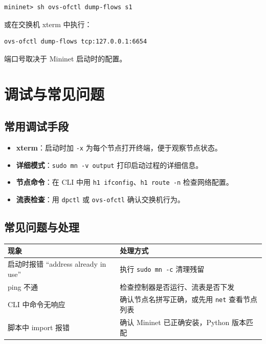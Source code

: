 \documentclass[12pt,a4paper,openany]{ctexbook}
\begin{document}
\begin{lstlisting}[style=bashstyle]
	mininet> sh ovs-ofctl dump-flows s1
\end{lstlisting}

或在交换机 xterm 中执行：

\begin{lstlisting}[style=bashstyle]
	ovs-ofctl dump-flows tcp:127.0.0.1:6654
\end{lstlisting}

端口号取决于 Mininet 启动时的配置。


\chapter{调试与常见问题}

\section{常用调试手段}

\begin{itemize}[leftmargin=*]
	\item \textbf{xterm}：启动时加 \texttt{-x} 为每个节点打开终端，便于观察节点状态。
	\item \textbf{详细模式}：\texttt{sudo mn -v output} 打印启动过程的详细信息。
	\item \textbf{节点命令}：在 CLI 中用 \texttt{h1 ifconfig}、\texttt{h1 route -n} 检查网络配置。
	\item \textbf{流表检查}：用 \texttt{dpctl} 或 \texttt{ovs-ofctl} 确认交换机行为。
\end{itemize}

\section{常见问题与处理}

\begin{center}
	\begin{tabular}{@{}p{5cm}p{8cm}@{}}
		\toprule
		\textbf{现象} & \textbf{处理方式} \\
		\midrule
		启动时报错 “address already in use” & 执行 \texttt{sudo mn -c} 清理残留 \\
		ping 不通 & 检查控制器是否运行、流表是否下发 \\
		CLI 中命令无响应 & 确认节点名拼写正确，或先用 \texttt{net} 查看节点列表 \\
		脚本中 import 报错 & 确认 Mininet 已正确安装，Python 版本匹配 \\
		\bottomrule
	\end{tabular}
\end{center}
\end{document}
